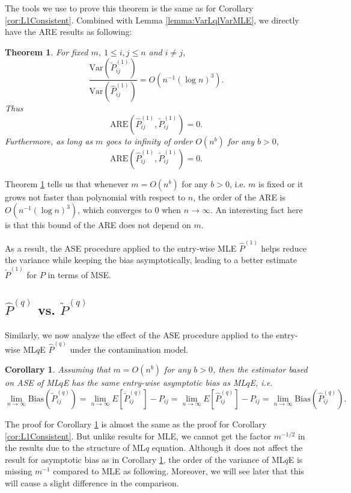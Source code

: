 \documentclass[a4paper]{article}
\newtheorem{theorem}[fact]{Theorem}
\newtheorem{corollary}[fact]{Corollary}
\renewcommand{\hat}{\widehat}
\begin{document}
The tools we use to prove this theorem is the same as for Corollary \ref{cor:L1Consistent}. Combined with Lemma \ref{lemma:VarLqlVarMLE}, we directly have the ARE results as following:
\begin{theorem}
\label{thm:AREL1}
For fixed $m$, $1 \le i, j \le n$ and $i \ne j$,
\[
	\frac{\mathrm{Var}(\widetilde{P}_{ij}^{(1)})}{\mathrm{Var}(\hat{P}_{ij}^{(1)})}
    = O(n^{-1} (\log n)^3).
\]
Thus
\[
	\mathrm{ARE}(\hat{P}_{ij}^{(1)}, \widetilde{P}_{ij}^{(1)}) = 0.
\]
Furthermore, as long as $m$ goes to infinity of order $O(n^b)$ for any $b > 0$,
\[
	\mathrm{ARE}(\hat{P}_{ij}^{(1)}, \widetilde{P}_{ij}^{(1)}) = 0.
\]
\end{theorem}

Theorem \ref{thm:AREL1} tells us that whenever $m = O(n^b)$ for any $b > 0$, i.e. $m$ is fixed or it grows not faster than polynomial with respect to $n$, the order of the ARE is $O(n^{-1} (\log n)^3)$, which converges to 0 when $n \to \infty$. An interesting fact here is that this bound of the ARE does not depend on $m$.

As a result, the ASE procedure applied to the entry-wise MLE $\hat{P}^{(1)}$ helps reduce the variance while keeping the bias asymptotically, leading to a better estimate $\widetilde{P}^{(1)}$ for $P$ in terms of MSE.



\subsection{$\hat{P}^{(q)}$ vs. $\widetilde{P}^{(q)}$}

Similarly, we now analyze the effect of the ASE procedure applied to the entry-wise ML$q$E $\hat{P}^{(q)}$ under the contamination model.

\begin{corollary}
\label{cor:LqConsistent}
Assuming that $m = O(n^b)$ for any $b > 0$, then the estimator based on ASE of ML$q$E has the same entry-wise asymptotic bias as ML$q$E, i.e.
\[
	\lim_{n \to \infty} \mathrm{Bias}(\widetilde{P}_{ij}^{(q)}) = \lim_{n \to \infty} E[\widetilde{P}_{ij}^{(q)}] - P_{ij} = \lim_{n \to \infty} E[\hat{P}^{(q)}_{ij}] - P_{ij}
    = \lim_{n \to \infty} \mathrm{Bias}(\hat{P}_{ij}^{(q)}).
\]
\end{corollary}

The proof for Corollary \ref{cor:LqConsistent} is almost the same as the proof for Corollary \ref{cor:L1Consistent}. But unlike results for MLE, we cannot get the factor $m^{-1/2}$ in the results due to the structure of ML$q$ equation. Although it does not affect the result for asymptotic bias as in Corollary \ref{cor:LqConsistent}, the order of the variance of ML$q$E is missing $m^{-1}$ compared to MLE as following. Moreover, we will see later that this will cause a slight difference in the comparison. 
\end{document}
